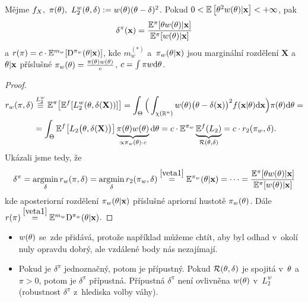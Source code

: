 \begin{theorem}
	Mějme $f_X,~\pi(\theta),~L_2^w(\theta,\delta):=w(\theta)(\theta-\delta)^2$. Pokud $0<\mathbb{E}\left[ \theta^2w(\theta)|\textbf{x} \right]<+\infty$, pak $$\delta^\pi(\textbf{x})=\frac{\mathbb{E}^\pi[{\theta w(\theta)|\textbf{x}}]}{\mathbb{E}^{\pi}[{w(\theta)|\textbf{x}}]}$$
	a $r(\pi)=c\cdot \mathbb{E}^{m_w}[\mathrm{D}^{\pi_w}(\theta|\textbf{x})]$, kde $m_w^{(*)}$ a~$\pi_w(\theta|\textbf{x})$ jsou marginální rozdělení $\textbf{X}$ a~$\theta|\textbf{x}$ příslušné $\pi_w(\theta)=\frac{\pi(\theta)w(\theta)}{c}$, $c=\int\pi w\mathrm{d}\theta$.
	\begin{proof}
		\[
		\begin{split}
		r_w(\pi,\delta)&\stackrel{L_2^w}{\equiv}\mathbb{E}^\pi\big[\mathbb{E}^f[L_2^w(\theta,\delta(\textbf{X}))]\big]=\int_\Theta\Big(\int_{\chi(\mathbb{R}^n)} w(\theta)\big(\theta-\delta(\textbf{x})\big)^2 f(\textbf{x}|\theta)\mathrm{d}\textbf{x}\Big)\pi(\theta)\mathrm{d}\theta=\\
		&= \int_\Theta \mathbb{E}^f\big[L_2\big(\theta,\delta(\textbf{X})\big)\big]\underbrace{ \pi(\theta)w(\theta)}_{\propto \pi_w(\theta)\cdot c}\mathrm{d}\theta = c\cdot\mathbb{E}^{\pi_w}\underbrace{\mathbb{E}^f (L_2)}_{\mathcal{R}(\theta,\delta)}=c\cdot r_2(\pi_w,\delta).
		\end{split}
		\]
		Ukázali jsme tedy, že  
		\begin{align*}
		\delta^\pi=\mathop{\mathrm{argmin}}_\delta r_w(\pi,\delta)=\mathop{\mathrm{argmin}}_\delta r_2(\pi_w,\delta)\stackrel{\ref{veta1}}{=}\mathbb{E}^{\pi_w}(\theta|\textbf{x})=\dots=\frac{\mathbb{E}^\pi[{\theta w(\theta)|\textbf{x}}]}{\mathbb{E}^{\pi}[{w(\theta)|\textbf{x}}]}
		\end{align*} 
		kde aposteriorní rozdělení $\pi_w(\theta|\textbf{x})$ příslušné apriorní hustotě $\pi_w(\theta)$. Dále $r(\pi)\stackrel{\ref{veta1}}{=}\mathbb{E}^{m_w}\mathrm{D}^{\pi_w}(\theta|\textbf{x})$.
	\end{proof}
\end{theorem}
\begin{remark}\begin{itemize}
		\item $w(\theta)$ se~zde přidává, protože například můžeme chtít, aby byl odhad v~okolí nuly opravdu dobrý, ale vzdálené body nás nezajímají.
		\item Pokud je $\delta^\pi$ jednoznačný, potom je přípustný. Pokud $\mathcal{R}(\theta,\delta)$ je spojitá v~$\theta$ a~$\pi>0$, potom je $\delta^\pi$ přípustná. Přípustná $\delta^\pi$ není ovlivněna $w(\theta)$ v~$L_2^w$ (robustnost $\delta^\pi$ z~hlediska volby váhy).
	\end{itemize}
\end{remark}

